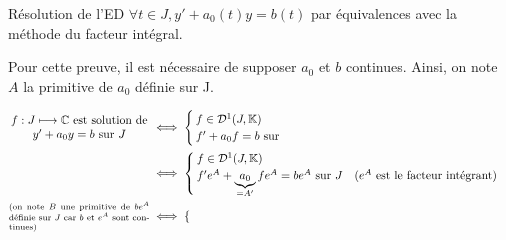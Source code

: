 \documentclass{article}
\date{10 novembre 2023}
\begin{document}
\maketitle

\begin{question_kholle}{Résolution de l'ED  $\forall t \in J, y' + a_{0}(t)y = b(t)$ par équivalences avec la méthode du facteur intégral.}

  Pour cette preuve, il est nécessaire de supposer $a_{0}$ et $b$ continues.
  Ainsi, on note $A$ la primitive de $a_{0}$ définie sur J.

  \begin{align*}
    \parbox{12em}{\centering$f:J\longmapsto\C$ est solution de $y'+a_{0}y=b$ sur $J$}                                     & \iff \begin{cases}
                                                                                                                                   f \in \mathcal{D}^1(J,\K) \\
                                                                                                                                   f'+ a_0f = b \text{ sur }
                                                                                                                                 \end{cases}                                                                                                                                         \\
                                                                                                                          & \iff \begin{cases}
                                                                                                                                   f\in\mathcal{D}^1(J,\K) \\
                                                                                                                                   f' e^{A} + \underbrace{a_{0}}_{=A'}f e^{A} = b e^{A} \text{ sur } J \quad\text{($e^{A}$ est le facteur intégrant)}
                                                                                                                                 \end{cases} \\
    \parbox{12em}{\scriptsize (on note $B$ une primitive de $b e^{A}$ définie sur $J$ car $b$ et $e^{A}$ sont continues)} & \iff \begin{cases}

\end{cases}
\end{align*}
\end{question_kholle}
\end{document}
